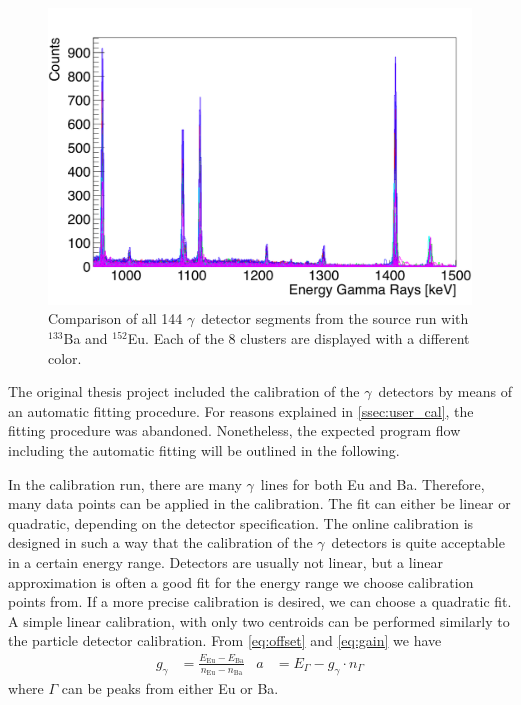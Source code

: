 \documentclass[twoside,english]{uiofysmaster/uiofysmaster}
\newcommand{\ga}{$\gamma$}
\let\orgautoref\autoref
\renewcommand{\autoref}
        {%
		 \def\sectionautorefname{Section}%
		 \def\subsectionautorefname{Section}%
		 \def\subsubsectionautorefname{Section}%
		 \def\chapterautorefname{Chapter}%
          \orgautoref}
\begin{document}
\begin{figure}[ht]
	\centering
	\includegraphics[width=\textwidth]{../Plots/comparing/gamma_comparison_full.png}
	\caption{Comparison of all 144 \ga\ detector segments from the source run with $^{133}$Ba and $^{152}$Eu. 
	Each of the 8 clusters are displayed with a different color.}
	\label{fig:gamma_comparison}
\end{figure}

The original thesis project included the calibration of the \ga\ detectors by means of an automatic fitting procedure.
For reasons explained in \autoref{ssec:user_cal}, the fitting procedure was abandoned.
Nonetheless, the expected program flow including the automatic fitting will be outlined in the following.

In the calibration run, there are many \ga\ lines for both Eu and Ba. 
Therefore, many data points can be applied in the calibration.
The fit can either be linear or quadratic, depending on the detector specification.
The online calibration is designed in such a way that the calibration of the \ga\ detectors is quite acceptable in a certain energy range.
Detectors are usually not linear, but a linear approximation is often a good fit for the energy range we choose calibration points from. 
If a more precise calibration is desired, we can choose a quadratic fit.
A simple linear calibration, with only two centroids can be performed similarly to the particle detector calibration.
From \autoref{eq:offset} and \autoref{eq:gain} we have
\begin{align}\label{eq:GGandA}
	g_\gamma &= \frac{E_{\text{Eu}} - E_{\text{Ba}}}{n_{\text{Eu}} - n_{\text{Ba}}} 
	&  
	a &= E_{\Gamma} - g_\gamma \cdot n_{\Gamma}
\end{align}
where $\Gamma$ can be peaks from either Eu or Ba.
\end{document}
